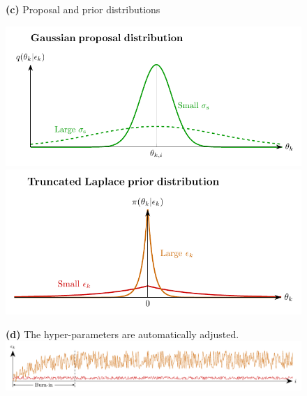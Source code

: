 \documentclass[border=10pt,varwidth=20cm]{standalone}
\begin{document}
{\begin{minipage}[c]{0.48\textwidth}
   \begin{figure}[H]
      \vspace{0.3cm}
      {\large \textbf{(c)} Proposal and prior distributions}
      \vspace{0.3cm}
      \centering
          
      \includegraphics[width=\textwidth]{panel3}
      \includegraphics[width=\textwidth]{panel4} 
   \end{figure}
\end{minipage}}

\bigskip

{\begin{minipage}[c]{0.985\textwidth}
   \begin{figure}[H]
      \centering
      \vspace{0.3cm}
      {\large \textbf{(d)} The hyper-parameters are automatically adjusted.}
      \vspace{0.3cm}
      \includegraphics[width=1\textwidth]{panel5}
   \end{figure}
\end{minipage}}
\end{document}
